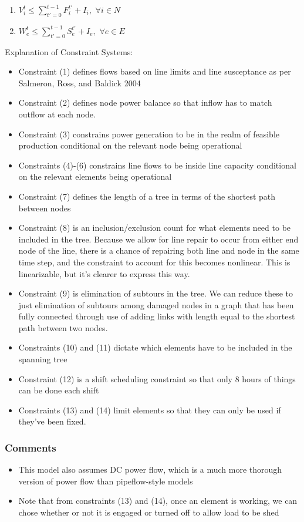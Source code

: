 \documentclass{article}
\begin{document}
\begin{enumerate}[label=(\arabic*), leftmargin=*, itemsep=0.4ex, before={\everymath{\displaystyle}}]
		\item $V_i^t \leq \sum_{t'=0}^{t-1} F_i^{t'}+I_i, \hspace{4pt} \forall i \in N$ 
		\item $W_{e}^t \leq \sum_{t'=0}^{t-1} S_{e}^{t'}+I_e, \hspace{4pt} \forall e \in E $
	\end{enumerate}
	
Explanation of Constraint Systems:
	\begin{itemize}
		\item Constraint (1) defines flows based on line limits and line susceptance as per Salmeron, Ross, and Baldick 2004 \cite{SalmeronEA2004}
		\item Constraint (2) defines node power balance so that inflow has to match outflow at each node.
		\item Constraint (3) constrains power generation to be in the realm of feasible production conditional on the relevant node being operational
		\item Constraints (4)-(6) constrains line flows to be inside line capacity conditional on the relevant elements being operational
		\item Constraint (7) defines the length of a tree in terms of the shortest path between nodes
		\item Constraint (8) is an inclusion/exclusion count for what elements need to be included in the tree. Because we allow for line repair to occur from either end node of the line, there is a chance of repairing both line and node in the same time step, and the constraint to account for this becomes nonlinear. This is linearizable, but it's clearer to express this way.
		\item Constraint (9) is elimination of subtours in the tree. We can reduce these to just elimination of subtours among damaged nodes in a graph that has been fully connected through use of adding links with length equal to the shortest path between two nodes.
		\item Constraints (10) and (11) dictate which elements have to be included in the spanning tree
		\item Constraint (12) is a shift scheduling constraint so that only 8 hours of things can be done each shift
		\item Constraints (13) and (14) limit elements so that they can only be used if they've been fixed.
	\end{itemize}
	
	\subsubsection{Comments}
	\begin{itemize}
		\item This model also assumes DC power flow, which is a much more thorough version of power flow than pipeflow-style models
		\item Note that from constraints (13) and (14), once an element is working, we can chose whether or not it is engaged or turned off to allow load to be shed
	\end{itemize}
	
\end{document}
